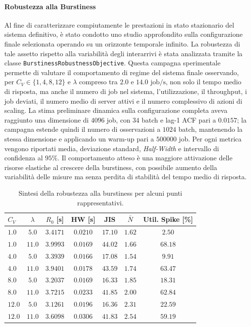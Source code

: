 ﻿\documentclass[a4paper,12pt]{article}
\begin{document}
\paragraph{Robustezza alla Burstiness}
Al fine di caratterizzare compiutamente le prestazioni in stato stazionario del sistema definitivo, è stato condotto uno studio approfondito sulla configurazione finale selezionata operando su un orizzonte temporale infinito. La robustezza di tale assetto rispetto alla variabilità degli interarrivi è stata analizzata tramite la classe \texttt{BurstinessRobustnessObjective}. Questa campagna sperimentale permette di valutare il comportamento di regime del sistema finale osservando, per $C_V\in\{1,4,8,12\}$ e $\lambda$ compreso tra $2.0$ e $14.0\text{ job/s}$, non solo il tempo medio di risposta, ma anche il numero di job nel sistema, l'utilizzazione, il throughput, i job deviati, il numero medio di server attivi e il numero complessivo di azioni di scaling. La stima preliminare dinamica sulla configurazione completa aveva raggiunto una dimensione di $4096$ job, con $34$ batch e lag-1 ACF pari a $0.0157$; la campagna estende quindi il numero di osservazioni a $1024$ batch, mantenendo la stessa dimensione e applicando un warm-up pari a $500000$ job. Per ogni metrica vengono riportati media, deviazione standard, \textit{Half-Width} e intervallo di confidenza al $95\%$. Il comportamento atteso è una maggiore attivazione delle risorse elastiche al crescere della burstiness, con possibile aumento della variabilità delle misure ma senza perdita di stabilità del tempo medio di risposta.

\begin{table}[H]
    \centering
    \small
    \renewcommand{\arraystretch}{1.2}
    \begin{tabular}{lcccccc}
        \hline
        \textbf{$C_V$} & \textbf{$\lambda$} & \textbf{$R_0$ [s]} & \textbf{HW [s]} & \textbf{JIS} & \textbf{$\bar{N}$} & \textbf{Util. Spike [\%]} \\ \hline
        $1.0$  & $5.0$  & $3.4171$ & $0.0210$ & $17.10$ & $1.62$ & $2.50$ \\
        $1.0$  & $11.0$ & $3.9993$ & $0.0169$ & $44.02$ & $1.66$ & $68.18$ \\
        $4.0$  & $5.0$  & $3.3939$ & $0.0166$ & $17.08$ & $1.54$ & $9.91$ \\
        $4.0$  & $11.0$ & $3.9401$ & $0.0178$ & $43.59$ & $1.74$ & $63.47$ \\
        $8.0$  & $5.0$  & $3.2037$ & $0.0169$ & $16.33$ & $1.85$ & $18.31$ \\
        $8.0$  & $11.0$ & $3.7215$ & $0.0233$ & $41.85$ & $2.00$ & $62.84$ \\
        $12.0$ & $5.0$  & $3.1261$ & $0.0196$ & $16.36$ & $2.31$ & $22.59$ \\
        $12.0$ & $11.0$ & $3.6098$ & $0.0306$ & $41.83$ & $2.54$ & $59.19$ \\ \hline
    \end{tabular}
    \caption{Sintesi della robustezza alla burstiness per alcuni punti rappresentativi.}
    \label{tab:burstiness_results}
\end{table}
\end{document}
